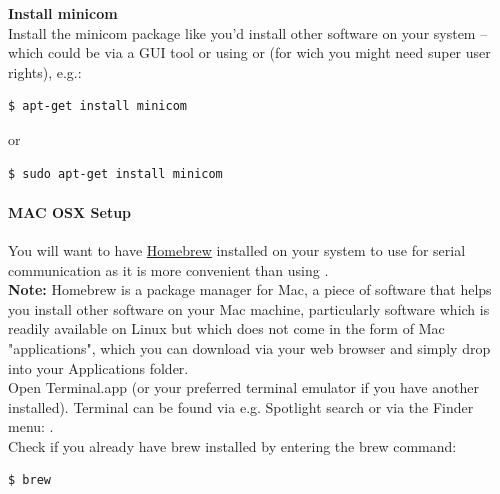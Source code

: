 \textbf{Install minicom}\\

Install the minicom package like you'd install other software on your system – which could be via a GUI tool or using  or  (for wich you might need super user rights), e.g.: 

\begin{lstlisting}[language=bash,morekeywords=$,keywordstyle=\bfseries,frame=none,xleftmargin=.25in,belowskip=2em, aboveskip=2em]
$ apt-get install minicom
\end{lstlisting}

or

\begin{lstlisting}[language=bash,morekeywords=$,keywordstyle=\bfseries,frame=none,xleftmargin=.25in,belowskip=2em, aboveskip=2em]
$ sudo apt-get install minicom
\end{lstlisting}

\paragraph{MAC OSX Setup}

You will want to have \href{https://brew.sh/}{Homebrew} installed on your system to use  for serial communication as it is more convenient than using .\\

\textbf{Note:} Homebrew is a package manager for Mac, a piece of software that helps you install other software on your Mac machine, particularly software which is readily available on Linux but which does not come in the form of Mac "applications", which you can download via your web browser and simply drop into your Applications folder.\\ 

Open Terminal.app (or your preferred terminal emulator if you have another installed). Terminal can be found via e.g. Spotlight search or via the Finder menu: .\\

Check if you already have brew installed by entering the brew command: 

\begin{lstlisting}[language=bash,morekeywords=$,keywordstyle=\bfseries,frame=none,xleftmargin=.25in,belowskip=2em, aboveskip=2em]
$ brew
\end{lstlisting}

